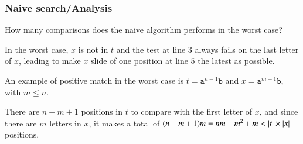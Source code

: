 %
\begin{frame}
\frametitle{Naive search/Analysis}

How many comparisons does the naive algorithm performs in the worst
case?

\bigskip

In the worst case, \(x\) is not in \(t\) and the test at line \(3\)
always fails on the last letter of \(x\), leading to make \(x\)
slide of one position at line \(5\) the latest as possible.

\bigskip

An example of positive match in the worst case is \(t =
\texttt{a}^{n-1}\texttt{b}\) and \(x = \texttt{a}^{m-1}\texttt{b}\),
with \(m \leq n\).

\bigskip

There are \(n - m + 1\) positions in \(t\) to compare with the first
letter of \(x\), and since there are \(m\) letters in \(x\), it makes
a total of \((n - m + 1) m = nm - m^2 + m < \lvert{t}\lvert{} \times \lvert{x}\lvert{}\)
positions.

\end{frame}
